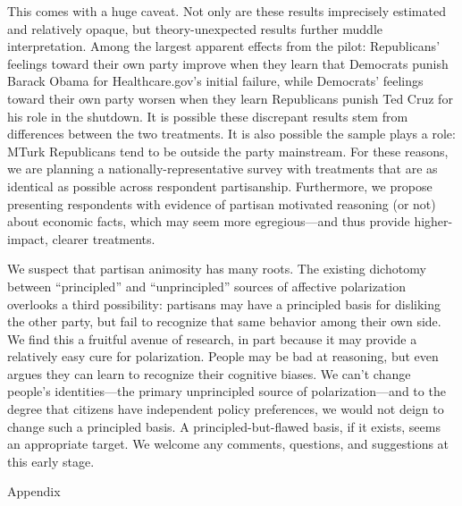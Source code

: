 \documentclass[12pt, letterpaper]{article}
\begin{document}
This comes with a huge caveat. Not only are these results imprecisely estimated and relatively opaque, but theory-unexpected results further muddle interpretation. Among the largest apparent effects from the pilot: Republicans' feelings toward their own party improve when they learn that Democrats punish Barack Obama for Healthcare.gov's initial failure, while Democrats' feelings toward their own party worsen when they learn Republicans punish Ted Cruz for his role in the shutdown. It is possible these discrepant results stem from differences between the two treatments. It is also possible the sample plays a role: MTurk Republicans tend to be outside the party mainstream. For these reasons, we are planning a nationally-representative survey with treatments that are as identical as possible across respondent partisanship. Furthermore, we propose presenting respondents with evidence of partisan motivated reasoning (or not) about economic facts, which may seem more egregious---and thus provide higher-impact, clearer treatments.

We suspect that partisan animosity has many roots. The existing dichotomy between ``principled'' and ``unprincipled'' sources of affective polarization overlooks a third possibility: partisans may have a principled basis for disliking the other party, but fail to recognize that same behavior among their own side. We find this a fruitful avenue of research, in part because it may provide a relatively easy cure for polarization. People may be bad at reasoning, but even \citet{Kahneman2011} argues they can learn to recognize their cognitive biases. We can't change people's identities---the primary unprincipled source of polarization---and to the degree that citizens have independent policy preferences, we would not deign to change such a principled basis. A principled-but-flawed basis, if it exists, seems an appropriate target. We welcome any comments, questions, and suggestions at this early stage.

\clearpage




\clearpage

\appendix
\renewcommand{\thesection}{A \arabic{section}}
\renewcommand\thetable{\thesection.\arabic{table}}  
\renewcommand\thefigure{\thesection.\arabic{figure}}

\begin{center}
\Large{Appendix}
\end{center}
\end{document}

